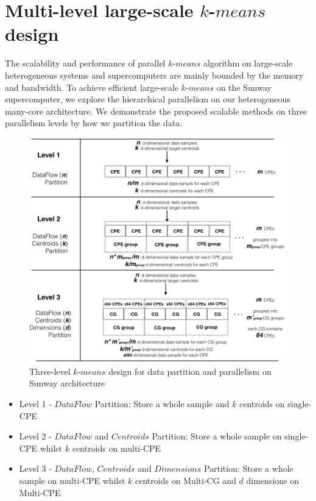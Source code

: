 \section{Multi-level large-scale $k$-$means$ design}
The scalability and performance of parallel $k$-$means$ algorithm on large-scale heterogeneous systems and supercomputers are mainly bounded by the memory and bandwidth. To achieve efficient large-scale $k$-$means$ on the Sunway supercomputer, we explore the hierarchical parallelism on our heterogeneous many-core architecture. We demonstrate the proposed scalable methods on three parallelism levels by how we partition the data. 

\begin{figure}
\centering
\includegraphics[scale=0.30]{partition.png}
\caption{Three-level $k$-$means$ design for data partition and parallelism on Sunway architecture}
\label{fig:fp}
\end{figure} 


\begin{itemize}

\item Level 1 - $DataFlow$ Partition: Store a whole sample and $k$ centroids on single-CPE 
\item Level 2 - $DataFlow$ and $Centroids$ Partition: Store a whole sample on single-CPE whilst $k$ centroids on multi-CPE
\item Level 3 - $DataFlow$,  $Centroids$ and $Dimensions$ Partition: Store a whole sample on multi-CPE whilst $k$ centroids on Multi-CG and $d$ dimensions on Multi-CPE

\end{itemize}

